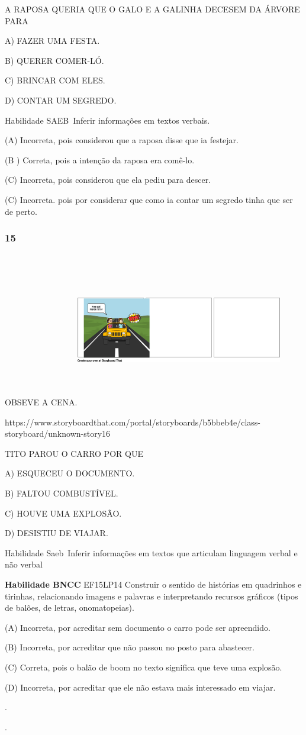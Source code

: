 A RAPOSA QUERIA QUE O GALO E A GALINHA DECESEM DA ÁRVORE PARA

A) FAZER UMA FESTA.

B) QUERER COMER-LÓ.

C) BRINCAR COM ELES.

D) CONTAR UM SEGREDO.

Habilidade SAEB~Inferir informações em textos verbais.

(A) Incorreta, pois considerou que a raposa disse que ia festejar.

(B ) Correta, pois a intenção da raposa era comê-lo.

(C) Incorreta, pois considerou que ela pediu para descer.

(C) Incorreta. pois por considerar que como ia contar um segredo tinha
que ser de perto.\protect\hypertarget{_heading=h.jyvxl0weyrwn}{}{}

\subsubsection{15}\label{section-87}

OBSEVE A
CENA.\includegraphics[width=3.56528in,height=2.66389in]{media/image254.png}

https://www.storyboardthat.com/portal/storyboards/b5bbeb4e/class-storyboard/unknown-story16

TITO PAROU O CARRO POR QUE

A) ESQUECEU O DOCUMENTO.

B) FALTOU COMBUSTÍVEL.

C) HOUVE UMA EXPLOSÃO.

D) DESISTIU DE VIAJAR.

Habilidade Saeb~Inferir informações em textos que articulam linguagem
verbal e não verbal

\textbf{Habilidade BNCC} EF15LP14 Construir o sentido de histórias em
quadrinhos e tirinhas, relacionando imagens e palavras e interpretando
recursos gráficos (tipos de balões, de letras, onomatopeias).

(A) Incorreta, por acreditar sem documento o carro pode ser apreendido.

(B) Incorreta, por acreditar que não passou no posto para abastecer.

(C) Correta, pois o balão de boom no texto significa que teve uma
explosão.

(D) Incorreta, por acreditar que ele não estava mais interessado em
viajar.

.

.
